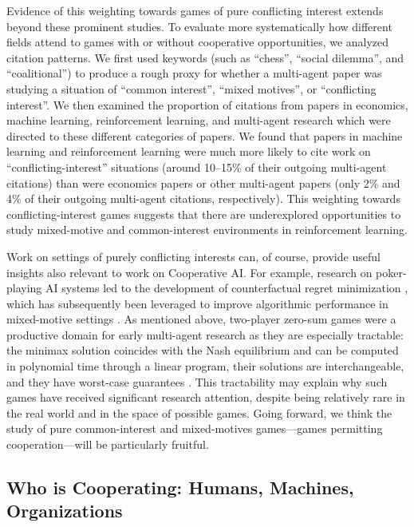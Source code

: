 \documentclass[11pt, a4paper, logo, onecolumn, nonumbering]{deepmind}
\begin{document}
Evidence of this weighting towards games of pure conflicting interest extends beyond these prominent studies. To evaluate more systematically how different fields attend to games with or without cooperative opportunities, we analyzed citation patterns. We first used keywords (such as ``chess'', ``social dilemma'', and ``coalitional'') to produce a rough proxy for whether a multi-agent paper was studying a situation of ``common interest'', ``mixed motives'', or ``conflicting interest''. We then examined the proportion of citations from papers in economics, machine learning, reinforcement learning, and multi-agent research which were directed to these different categories of papers. We found that papers in machine learning and reinforcement learning were much more likely to cite work on ``conflicting-interest'' situations (around 10--15\% of their outgoing multi-agent citations) than were economics papers or other multi-agent papers (only 2\% and 4\% of their outgoing multi-agent citations, respectively). This weighting towards conflicting-interest games suggests that there are underexplored opportunities to study mixed-motive and common-interest environments in reinforcement learning.

Work on settings of purely conflicting interests can, of course, provide useful insights also relevant to work on Cooperative AI. For example, research on poker-playing AI systems led to the development of counterfactual regret minimization \cite{zinkevich2008regret}, which has subsequently been leveraged to improve algorithmic performance in mixed-motive settings \cite{serrino2019finding}. As mentioned above, two-player zero-sum games were a productive domain for early multi-agent research as they are especially tractable: the minimax solution coincides with the Nash equilibrium and can be computed in polynomial time through a linear program, their solutions are interchangeable, and they have worst-case guarantees \cite{von2007theory}. This tractability may explain why such games have received significant research attention, despite being relatively rare in the real world and in the space of possible games. Going forward, we think the study of pure common-interest and mixed-motives games---games permitting cooperation---will be particularly fruitful.

\subsection{Who is Cooperating: Humans, Machines, Organizations}
\end{document}
